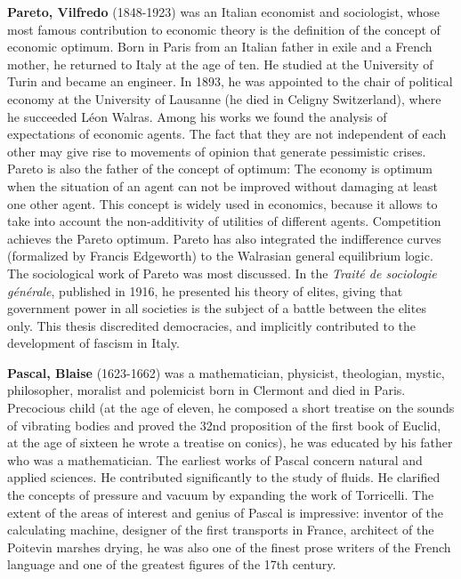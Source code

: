 {}
\label{sec:P}

\textbf{Pareto, Vilfredo} (1848-1923) was an Italian economist and sociologist, whose most famous contribution to economic theory is the definition of the concept of economic optimum. Born in Paris from an Italian father in exile and a French mother, he returned to Italy at the age of ten. He studied at the University of Turin and became an engineer. In 1893, he was appointed to the chair of political economy at the University of Lausanne (he died in Celigny Switzerland), where he succeeded Léon Walras. Among his works we found the analysis of expectations of economic agents. The fact that they are not independent of each other may give rise to movements of opinion that generate pessimistic crises. Pareto is also the father of the concept of optimum: The economy is optimum when the situation of an agent can not be improved without damaging at least one other agent. This concept is widely used in economics, because it allows to take into account the non-additivity of utilities of different agents. Competition achieves the Pareto optimum. Pareto has also integrated the indifference curves (formalized by Francis Edgeworth) to the Walrasian general equilibrium logic. The sociological work of Pareto was most discussed. In the \textit{Traité de sociologie générale}, published in 1916, he presented his theory of elites, giving that government power in all societies is the subject of a battle between the elites only. This thesis discredited democracies, and implicitly contributed to the development of fascism in Italy.

\textbf{Pascal, Blaise} (1623-1662) was a mathematician, physicist, theologian, mystic, philosopher, moralist and polemicist born in Clermont and died in Paris. Precocious child (at the age of eleven, he composed a short treatise on the sounds of vibrating bodies and proved the 32nd proposition of the first book of Euclid, at the age of sixteen he wrote a treatise on conics), he was educated by his father who was a mathematician. The earliest works of Pascal concern natural and applied sciences. He contributed significantly to the study of fluids. He clarified the concepts of pressure and vacuum by expanding the work of Torricelli. The extent of the areas of interest and genius of Pascal is impressive: inventor of the calculating machine, designer of the first transports in France, architect of the Poitevin marshes drying, he was also one of the finest prose writers of the French language and one of the greatest figures of the 17th century.

